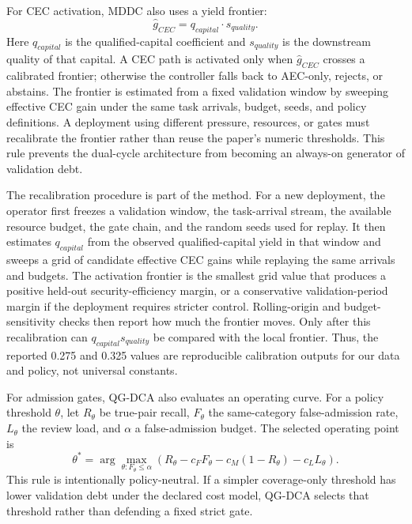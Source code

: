 ﻿\documentclass[lettersize,journal]{IEEEtran}
\begin{document}
For CEC activation, MDDC also uses a yield frontier:
\begin{equation}
\hat{g}_{CEC}=q_{capital}\cdot s_{quality}.
\end{equation}
Here $q_{capital}$ is the qualified-capital coefficient and $s_{quality}$ is the downstream quality of that capital. A CEC path is activated only when $\hat{g}_{CEC}$ crosses a calibrated frontier; otherwise the controller falls back to AEC-only, rejects, or abstains. The frontier is estimated from a fixed validation window by sweeping effective CEC gain under the same task arrivals, budget, seeds, and policy definitions. A deployment using different pressure, resources, or gates must recalibrate the frontier rather than reuse the paper's numeric thresholds. This rule prevents the dual-cycle architecture from becoming an always-on generator of validation debt.

The recalibration procedure is part of the method. For a new deployment, the operator first freezes a validation window, the task-arrival stream, the available resource budget, the gate chain, and the random seeds used for replay. It then estimates $q_{capital}$ from the observed qualified-capital yield in that window and sweeps a grid of candidate effective CEC gains while replaying the same arrivals and budgets. The activation frontier is the smallest grid value that produces a positive held-out security-efficiency margin, or a conservative validation-period margin if the deployment requires stricter control. Rolling-origin and budget-sensitivity checks then report how much the frontier moves. Only after this recalibration can $q_{capital}s_{quality}$ be compared with the local frontier. Thus, the reported 0.275 and 0.325 values are reproducible calibration outputs for our data and policy, not universal constants.

For admission gates, QG-DCA also evaluates an operating curve. For a policy threshold $\theta$, let $R_\theta$ be true-pair recall, $F_\theta$ the same-category false-admission rate, $L_\theta$ the review load, and $\alpha$ a false-admission budget. The selected operating point is
\begin{equation}
\theta^*=\arg\max_{\theta:F_\theta\leq \alpha}
\left(R_\theta-c_FF_\theta-c_M(1-R_\theta)-c_LL_\theta\right).
\end{equation}
This rule is intentionally policy-neutral. If a simpler coverage-only threshold has lower validation debt under the declared cost model, QG-DCA selects that threshold rather than defending a fixed strict gate.
\end{document}
